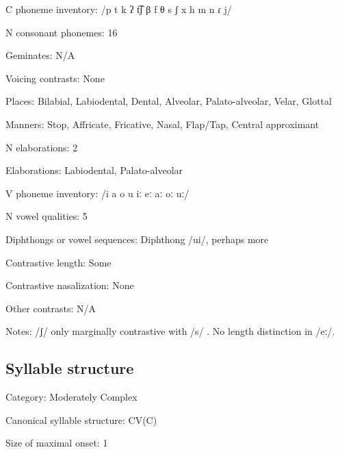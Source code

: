 {\begin{appendixdesc}
\item[C phoneme inventory:] /p t k ʔ t͡ʃ β f θ s ʃ x h m n ɾ j/

\item[N consonant phonemes:] 16

\item[Geminates:] N/A

\item[Voicing contrasts:] None

\item[Places:] Bilabial, Labiodental, Dental, Alveolar, Palato-alveolar, Velar, Glottal

\item[Manners:] Stop, Affricate, Fricative, Nasal, Flap/Tap, Central approximant

\item[N elaborations:] 2

\item[Elaborations:] Labiodental, Palato-alveolar

\item[V phoneme inventory:] /i a o u iː eː aː oː uː/

\item[N vowel qualities:] 5

\item[Diphthongs or vowel sequences:] Diphthong /ui/, perhaps more

\item[Contrastive length:] Some

\item[Contrastive nasalization:] None

\item[Other contrasts:] N/A

\item[Notes:] /ʃ/ only marginally contrastive with /s/ \citep[17]{Bright1957}. No length distinction in /eː/.
\end{appendixdesc}
\subsection*{Syllable structure}
\begin{appendixdesc}

\item[Category:] Moderately Complex

\item[Canonical syllable structure:] CV(C) \citep[11]{Bright1957}

\item[Size of maximal onset:] 1


\end{appendixdesc}}
